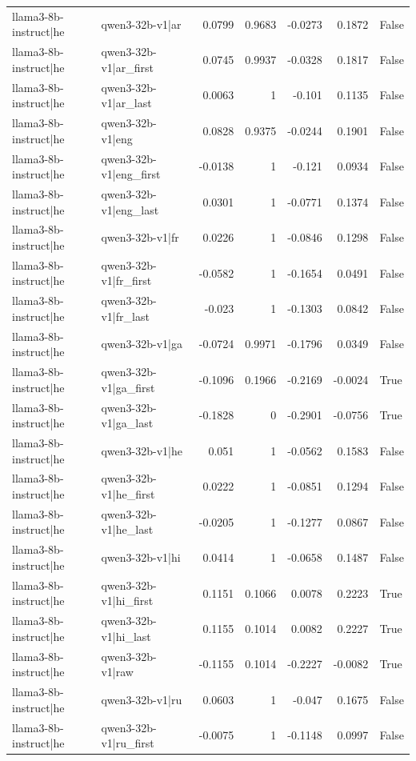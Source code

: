 \begin{table}
\begin{tabular}{l l r r r r l}
llama3-8b-instruct|he & qwen3-32b-v1|ar & 0.0799 & 0.9683 & -0.0273 & 0.1872 & False \\
llama3-8b-instruct|he & qwen3-32b-v1|ar_first & 0.0745 & 0.9937 & -0.0328 & 0.1817 & False \\
llama3-8b-instruct|he & qwen3-32b-v1|ar_last & 0.0063 & 1 & -0.101 & 0.1135 & False \\
llama3-8b-instruct|he & qwen3-32b-v1|eng & 0.0828 & 0.9375 & -0.0244 & 0.1901 & False \\
llama3-8b-instruct|he & qwen3-32b-v1|eng_first & -0.0138 & 1 & -0.121 & 0.0934 & False \\
llama3-8b-instruct|he & qwen3-32b-v1|eng_last & 0.0301 & 1 & -0.0771 & 0.1374 & False \\
llama3-8b-instruct|he & qwen3-32b-v1|fr & 0.0226 & 1 & -0.0846 & 0.1298 & False \\
llama3-8b-instruct|he & qwen3-32b-v1|fr_first & -0.0582 & 1 & -0.1654 & 0.0491 & False \\
llama3-8b-instruct|he & qwen3-32b-v1|fr_last & -0.023 & 1 & -0.1303 & 0.0842 & False \\
llama3-8b-instruct|he & qwen3-32b-v1|ga & -0.0724 & 0.9971 & -0.1796 & 0.0349 & False \\
llama3-8b-instruct|he & qwen3-32b-v1|ga_first & -0.1096 & 0.1966 & -0.2169 & -0.0024 & True \\
llama3-8b-instruct|he & qwen3-32b-v1|ga_last & -0.1828 & 0 & -0.2901 & -0.0756 & True \\
llama3-8b-instruct|he & qwen3-32b-v1|he & 0.051 & 1 & -0.0562 & 0.1583 & False \\
llama3-8b-instruct|he & qwen3-32b-v1|he_first & 0.0222 & 1 & -0.0851 & 0.1294 & False \\
llama3-8b-instruct|he & qwen3-32b-v1|he_last & -0.0205 & 1 & -0.1277 & 0.0867 & False \\
llama3-8b-instruct|he & qwen3-32b-v1|hi & 0.0414 & 1 & -0.0658 & 0.1487 & False \\
llama3-8b-instruct|he & qwen3-32b-v1|hi_first & 0.1151 & 0.1066 & 0.0078 & 0.2223 & True \\
llama3-8b-instruct|he & qwen3-32b-v1|hi_last & 0.1155 & 0.1014 & 0.0082 & 0.2227 & True \\
llama3-8b-instruct|he & qwen3-32b-v1|raw & -0.1155 & 0.1014 & -0.2227 & -0.0082 & True \\
llama3-8b-instruct|he & qwen3-32b-v1|ru & 0.0603 & 1 & -0.047 & 0.1675 & False \\
llama3-8b-instruct|he & qwen3-32b-v1|ru_first & -0.0075 & 1 & -0.1148 & 0.0997 & False \\

\end{tabular}
\end{table}
